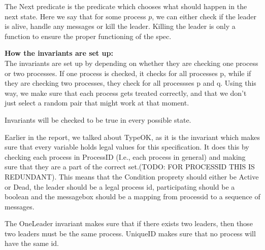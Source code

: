 \documentclass{report}
\begin{document}
\begin{calloutgreen}
\begin{calloutyellow}
The Next predicate is the predicate which chooses what should happen in the next state. Here we say that for some process $p$, we can either check if the leader is alive, handle any messages or kill the leader. Killing the leader is only a function to ensure the proper functioning of the spec.



\noindent{}

\textbf{How the invariants are set up:}\\
The invariants are set up by depending on whether they are checking one process or two processes. If one process is checked, it checks for all processes p, while if they are checking two processes, they check for all processses p and q. Using this way, we make sure that each process gets treated correctly, and that we don't just select a random pair that might work at that moment.


Invariants will be checked to be true in every possible state.

Earlier in the report, we talked about TypeOK, as it is the invariant which makes sure that every variable holds legal values for this specification.
It does this by checking each process in ProcessID (I.e., each process in general) and making sure that they are a part of the correct set.(TODO: FOR PROCESSID THIS IS REDUNDANT). This means that the Condition proprety should either be Active or Dead, the leader should be a legal process id, participating should be a boolean and the messagebox should be a mapping from processid to a sequence of messages.

The OneLeader invariant makes sure that if there exists two leaders, then those two leaders must be the same process.
%
UniqueID makes sure that no process will have the same id.


\end{calloutyellow}
\end{calloutgreen}
\end{document}
